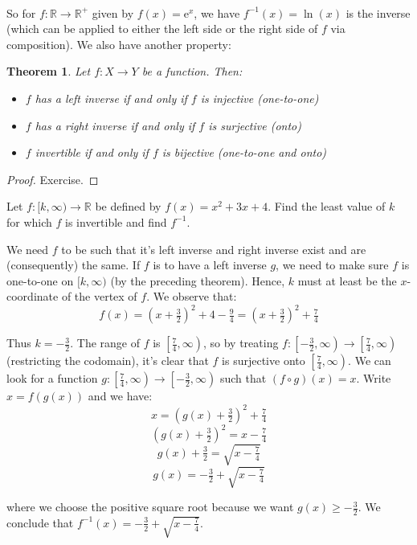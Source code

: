 \documentclass[12pt, a4paper, titlepage, twoside]{article}
\newcommand*{\R}{\mathbb{R}}
\newcommand*{\e}{\textrm{e}}
\newtheorem*{theorem*}{Theorem}
\newcounter{excount}[subsection]
\begin{document}
	\paragraph{}
	So for $f : \R \to \R^+$ given by $f(x) = \e^x$, we have $f^{-1}(x) = \ln(x)$ is the inverse (which can be applied to either the left side
	or the right side of $f$ via composition). We also have another property:\\
	
	\begin{pf}
		\label{fun-prop-ex}
		\begin{theorem*}
			Let $f : X \to Y$ be a function. Then:
			\begin{itemize}
				\item $f$ has a left inverse if and only if $f$ is injective (one-to-one)
				\item $f$ has a right inverse if and only if $f$ is surjective (onto)
				\item $f$ invertible if and only if $f$ is bijective (one-to-one and onto)
			\end{itemize}
		\end{theorem*}
		
		\tcbline
		
		\begin{proof}
			Exercise.
		\end{proof}
	\end{pf}
	
	\hfill
	
	\begin{ex}
		Let $f : [k, \infty) \to \R$ be defined by $f(x) = x^2+3x+4$. Find the least value of $k$ for which $f$ is invertible and find
		$f^{-1}$.
		
		\hfill
		\tcbline
		\hfill
		
		We need $f$ to be such that it's left inverse and right inverse exist and are (consequently) the same. If $f$ is to have a left inverse
		$g$, we need to make sure $f$ is one-to-one on $[k, \infty)$ (by the preceding theorem). Hence, $k$ must at least be the $x$-coordinate
		of the vertex of $f$. We observe that:
		\[ f(x) = (x+\tfrac{3}{2})^2 + 4 - \tfrac{9}{4} = (x+\tfrac{3}{2})^2 + \tfrac{7}{4} \]
		
		Thus $k = -\frac{3}{2}$. The range of $f$ is $\left[\tfrac{7}{4}, \infty\right)$, so by treating $f : \left[-\tfrac{3}{2}, \infty\right) \to 
		\left[\tfrac{7}{4}, \infty\right)$ (restricting the codomain),
		it's clear that $f$ is surjective onto $\left[\tfrac{7}{4}, \infty\right)$. We can look for a function $g : \left[\tfrac{7}{4}, \infty\right) \to 
		\left[-\tfrac{3}{2}, \infty\right)$ such that $(f \circ g)(x) = x$. Write $x = f(g(x))$ and we have:
		\[ x = (g(x)+\tfrac{3}{2})^2 + \tfrac{7}{4} \]
		\[ (g(x)+\tfrac{3}{2})^2 = x - \tfrac{7}{4} \]
		\[ g(x)+\tfrac{3}{2} = \sqrt{x - \tfrac{7}{4}} \]
		\[ g(x) = - \tfrac{3}{2} + \sqrt{x - \tfrac{7}{4}} \]
		
		where we choose the positive square root because we want $g(x) \geqslant -\frac{3}{2}$. We conclude that $f^{-1}(x) = -\frac{3}{2} + 
		\sqrt{x - \frac{7}{4}}$.
	\end{ex}
	
\end{document}
